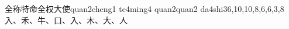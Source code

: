 \begin{EntryWithPhonetic}{全称特命全权大使}{quan2cheng1 te4ming4 quan2quan2 da4shi3}{6,10,10,8,6,6,3,8}{⼊、⽲、⽜、⼝、⼊、⽊、⼤、⼈}
\end{EntryWithPhonetic}
